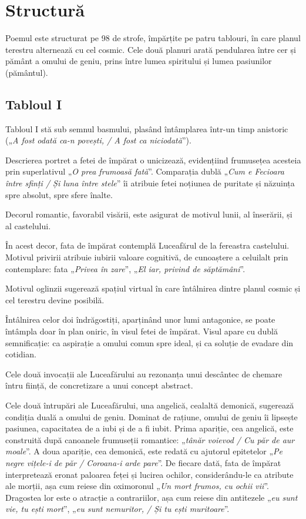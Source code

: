 \documentclass{article}
\newcommand{\qu}[1]{„\emph{#1}”}
\begin{document}
\section{Structură}
Poemul este structurat pe 98 de strofe, împărțite pe patru tablouri, în care planul terestru alternează cu cel cosmic. Cele două planuri arată pendularea între cer și pământ a omului de geniu, prins între lumea spiritului și lumea pasiunilor (pământul).

\subsection{Tabloul I}
Tabloul I stă sub semnul basmului, plasând întâmplarea într-un timp anistoric (\qu{A fost odată ca-n povești, / A fost ca niciodată}).

Descrierea portret a fetei de împărat o unicizează, evidențiind frumusețea acesteia prin superlativul \qu{O prea frumoasă fată}. Comparația dublă \qu{Cum e Fecioara între sfinți / Și luna între stele} îi atribuie fetei noțiunea de puritate și năzuința spre absolut, spre sfere înalte.

Decorul romantic, favorabil visării, este asigurat de motivul lunii, al înserării, și al castelului.

În acest decor, fata de împărat contemplă Luceafărul de la fereastra castelului. Motivul privirii atribuie iubirii valoare cognitivă, de cunoaștere a celuilalt prin contemplare: fata \qu{Privea în zare}, \qu{El iar, privind de săptămâni}.

Motivul oglinzii sugerează spațiul virtual în care întâlnirea dintre planul cosmic și cel terestru devine posibilă.

Întâlnirea celor doi îndrăgostiți, aparținând unor lumi antagonice, se poate întâmpla doar în plan oniric, în visul fetei de împărat. Visul apare cu dublă semnificație: ca aspirație a omului comun spre ideal, și ca soluție de evadare din cotidian.

Cele două invocații ale Luceafărului au rezonanța unui descântec de chemare întru ființă, de concretizare a unui concept abstract.

Cele două întrupări ale Luceafărului, una angelică, cealaltă demonică, sugerează condiția duală a omului de geniu. Dominat de rațiune, omului de geniu îi lipsește pasiunea, capacitatea de a iubi și de a fi iubit. Prima apariție, cea angelică, este construită după canoanele frumuseții romantice: \qu{tânăr voievod / Cu păr de aur moale}. A doua apariție, cea demonică, este redată cu ajutorul epitetelor \qu{Pe negre vițele-i de păr / Coroana-i arde pare}. De fiecare dată, fata de împărat interpretează eronat paloarea feței și lucirea ochilor, considerându-le ca atribute ale morții, așa cum reiese din oximoronul \qu{Un mort frumos, cu ochii vii}. Dragostea lor este o atracție a contrariilor, așa cum reiese din antitezele \qu{eu sunt vie, tu ești mort}, \qu{eu sunt nemuritor, / Și tu ești muritoare}.
\end{document}
